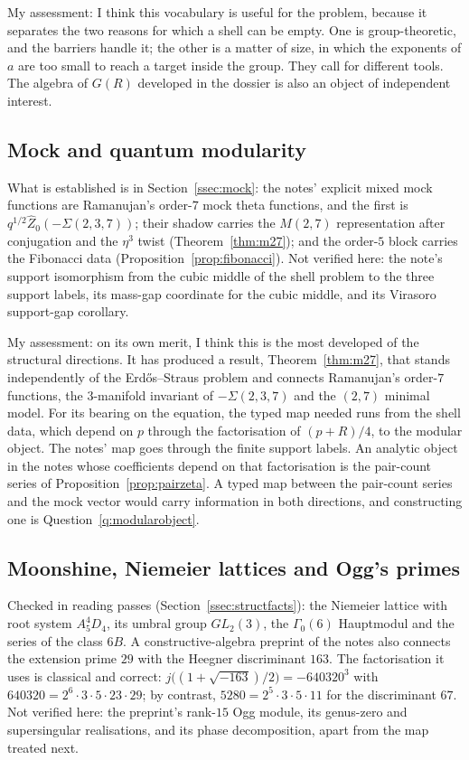 My assessment: I think this vocabulary is useful for the problem, because it separates the two reasons for which a shell can be empty. One is group-theoretic, and the barriers handle it; the other is a matter of size, in which the exponents of $a$ are too small to reach a target inside the group. They call for different tools. The algebra of $G(R)$ developed in the dossier is also an object of independent interest.

\subsection{Mock and quantum modularity}

What is established is in Section~\ref{ssec:mock}: the notes' explicit mixed mock functions are Ramanujan's order-$7$ mock theta functions, and the first is $q^{1/2}\widehat Z_0(-\Sigma(2,3,7))$; their shadow carries the $M(2,7)$ representation after conjugation and the $\eta^3$ twist (Theorem~\ref{thm:m27}); and the order-$5$ block carries the Fibonacci data (Proposition~\ref{prop:fibonacci}). Not verified here: the note's support isomorphism from the cubic middle of the shell problem to the three support labels, its mass-gap coordinate for the cubic middle, and its Virasoro support-gap corollary.

My assessment: on its own merit, I think this is the most developed of the structural directions. It has produced a result, Theorem~\ref{thm:m27}, that stands independently of the Erdős--Straus problem and connects Ramanujan's order-$7$ functions, the $3$-manifold invariant of $-\Sigma(2,3,7)$ and the $(2,7)$ minimal model. For its bearing on the equation, the typed map needed runs from the shell data, which depend on $p$ through the factorisation of $(p+R)/4$, to the modular object. The notes' map goes through the finite support labels. An analytic object in the notes whose coefficients depend on that factorisation is the pair-count series of Proposition~\ref{prop:pairzeta}. A typed map between the pair-count series and the mock vector would carry information in both directions, and constructing one is Question~\ref{q:modularobject}.

\subsection{Moonshine, Niemeier lattices and Ogg's primes}

Checked in reading passes (Section~\ref{ssec:structfacts}): the Niemeier lattice with root system $A_5^4D_4$, its umbral group $GL_2(3)$, the $\Gamma_0(6)$ Hauptmodul and the series of the class $6B$. A constructive-algebra preprint of the notes also connects the extension prime $29$ with the Heegner discriminant $163$. The factorisation it uses is classical and correct: $j\bigl((1+\sqrt{-163})/2\bigr)=-640320^3$ with $640320=2^6\cdot3\cdot5\cdot23\cdot29$; by contrast, $5280=2^5\cdot3\cdot5\cdot11$ for the discriminant $67$. Not verified here: the preprint's rank-$15$ Ogg module, its genus-zero and supersingular realisations, and its phase decomposition, apart from the map treated next.

